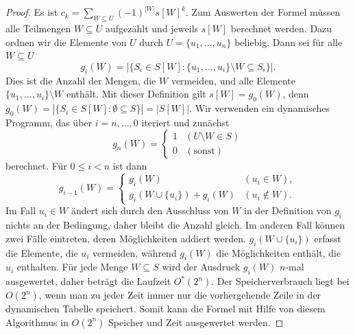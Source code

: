   \begin{proof}
    Es ist \(c_k = \sum_{W \subseteq U} (-1)^{ |W| } s[W]^k\). Zum Auswerten der Formel müssen alle Teilmengen \(W \subseteq U\) aufgezählt und jeweils \(s[W]\) berechnet werden. Dazu ordnen wir die Elemente von \(U\) durch \(U = \{u_1,...,u_n\}\) beliebig. Dann sei für alle \(W \subseteq U\)
    \[ g_i(W) = | \{ S_i \in S[W] : \{ u_1, ..., u_i \} \setminus W \subseteq S_i \} |. \]
    Dies ist die Anzahl der Mengen, die \(W\) vermeiden, und alle Elemente \(\{ u_1, ..., u_i \} \setminus W\) enthält.
    Mit dieser Definition gilt \(s[W] = g_0(W)\), denn \(g_0(W) = | \{ S_i \in S[W] : \emptyset \subseteq S \} | = | S[W] |\). Wir verwenden ein dynamisches Programm, das über \(i = n, ..., 0\) iteriert und zunächst
    \[
       g_n(W) =
       \begin{cases}
          1 & (U \setminus W \in S) \\
          0 & (\text{sonst})
       \end{cases}
    \]
    berechnet. Für \(0 \leq i < n\) ist dann
    \[
      g_{i-1}(W) =
      \begin{cases}
         g_i(W) & (u_i \in W), \\
         g_i(W \cup \{ u_i \}) + g_i(W) & (u_i \notin W).
      \end{cases}
    \]
    Im Fall \(u_i \in W\) ändert sich durch den Ausschluss von \(W\) in der Definition von \(g_i\) nichts an der Bedingung, daher bleibt die Anzahl gleich. Im anderen Fall können zwei Fälle eintreten, deren Möglichkeiten addiert werden. \(g_i(W \cup \{ u_i \})\) erfasst die Elemente, die \(u_i\) vermeiden, während \(g_i(W)\) die Möglichkeiten enthält, die \(u_i\) enthalten. Für jede Menge \(W \subseteq S\) wird der Ausdruck \(g_i(W)\) \(n\)-mal ausgewertet, daher beträgt die Laufzeit \(O^*(2^n)\). Der Speicherverbrauch liegt bei \(O(2^n)\), wenn man zu jeder Zeit immer nur die vorhergehende Zeile in der dynamischen Tabelle speichert. Somit kann die Formel mit Hilfe von diesem Algorithmus in \(O(2^n)\) Speicher und Zeit ausgewertet werden.
  \end{proof}










